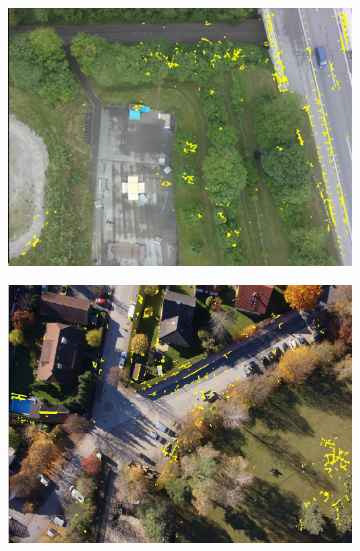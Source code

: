 \begin{figure}[tbp]
\begin{subfigure}[b]{0.243\textwidth}
           \includegraphics[width=\textwidth]{figures_matches/highway_Fmatch.jpg}
       \end{subfigure}
       \hfill
       \begin{subfigure}[b]{0.243\textwidth}   
           \centering 
           \includegraphics[width=\textwidth]{figures_matches/eichenau2_Fmatch.jpg}
       \end{subfigure}
       \hfill
       \begin{subfigure}[b]{0.243\textwidth}   
           \centering 

\end{subfigure}
\end{figure}
